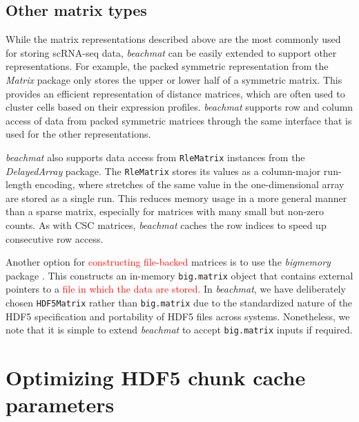 \documentclass{article}
\newcommand{\beachmat}{\textit{beachmat}}
\newcommand{\code}[1]{\texttt{#1}}
\newcommand{\revised}[1]{\textcolor{red}{#1}}
\begin{document}
\subsection{Other matrix types}
While the matrix representations described above are the most commonly used for storing scRNA-seq data, \beachmat{} can be easily extended to support other representations.
For example, the packed symmetric representation from the \textit{Matrix} package only stores the upper or lower half of a symmetric matrix.
This provides an efficient representation of distance matrices, which are often used to cluster cells based on their expression profiles.
\beachmat{} supports row and column access of data from packed symmetric matrices through the same interface that is used for the other representations.

\beachmat{} also supports data access from \code{RleMatrix} instances from the \textit{DelayedArray} package.
The \code{RleMatrix} stores its values as a column-major run-length encoding, where stretches of the same value in the one-dimensional array are stored as a single run.
This reduces memory usage in a more general manner than a sparse matrix, especially for matrices with many small but non-zero counts.
As with CSC matrices, \beachmat{} caches the row indices to speed up consecutive row access.

Another option for \revised{constructing file-backed} matrices is to use the \textit{bigmemory} package \cite{kane2013scalable}.
This constructs an in-memory \code{big.matrix} object that contains external pointers to a \revised{file in which the data are stored.}
In \beachmat{}, we have deliberately chosen \code{HDF5Matrix} rather than \code{big.matrix} due to the standardized nature of the HDF5 specification and portability of HDF5 files across systems.
Nonetheless, we note that it is simple to extend \beachmat{} to accept \code{big.matrix} inputs if required.

\section{Optimizing HDF5 chunk cache parameters}
\label{sec:layoutoptim}
\end{document}
